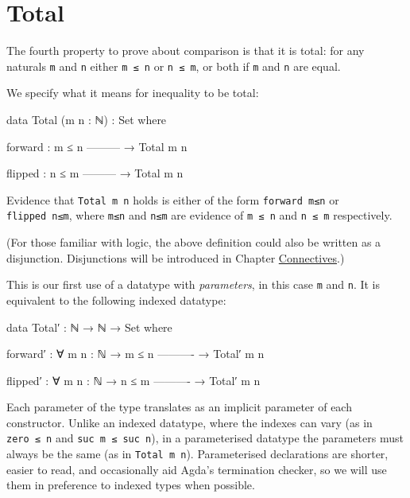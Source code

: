 \hypertarget{total}{%
\section{Total}\label{total}}

The fourth property to prove about comparison is that it is total: for
any naturals \texttt{m} and \texttt{n} either \texttt{m\ ≤\ n} or
\texttt{n\ ≤\ m}, or both if \texttt{m} and \texttt{n} are equal.

We specify what it means for inequality to be total:

\begin{fence}
\begin{code}
data Total (m n : ℕ) : Set where

  forward :
      m ≤ n
      ---------
    → Total m n

  flipped :
      n ≤ m
      ---------
    → Total m n
\end{code}
\end{fence}

Evidence that \texttt{Total\ m\ n} holds is either of the form
\texttt{forward\ m≤n} or \texttt{flipped\ n≤m}, where \texttt{m≤n} and
\texttt{n≤m} are evidence of \texttt{m\ ≤\ n} and \texttt{n\ ≤\ m}
respectively.

(For those familiar with logic, the above definition could also be
written as a disjunction. Disjunctions will be introduced in Chapter
\protect\hyperlink{Connectives}{Connectives}.)

This is our first use of a datatype with \emph{parameters}, in this case
\texttt{m} and \texttt{n}. It is equivalent to the following indexed
datatype:

\begin{fence}
\begin{code}
data Total′ : ℕ → ℕ → Set where

  forward′ : ∀ {m n : ℕ}
    → m ≤ n
      ----------
    → Total′ m n

  flipped′ : ∀ {m n : ℕ}
    → n ≤ m
      ----------
    → Total′ m n
\end{code}
\end{fence}

Each parameter of the type translates as an implicit parameter of each
constructor. Unlike an indexed datatype, where the indexes can vary (as
in \texttt{zero\ ≤\ n} and \texttt{suc\ m\ ≤\ suc\ n}), in a
parameterised datatype the parameters must always be the same (as in
\texttt{Total\ m\ n}). Parameterised declarations are shorter, easier to
read, and occasionally aid Agda's termination checker, so we will use
them in preference to indexed types when possible.

